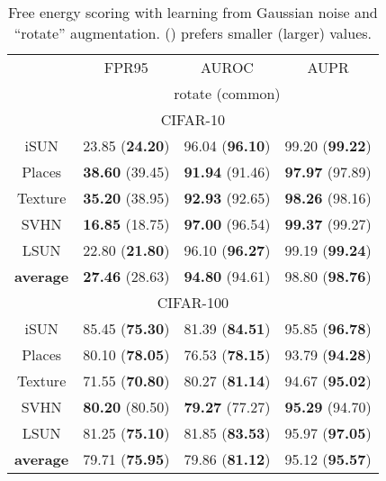 \documentclass{article}
\begin{document}
\begin{table}[t]
{{}}~~~~
\parbox{.47\linewidth}{
\centering
\caption{{Free energy scoring with learning from Gaussian noise and ``rotate'' augmentation.  () prefers smaller (larger) values.}} \label{tab: eneregy rotate}
\vspace{5pt}
\scriptsize{
\begin{tabular}{c|ccc}
\toprule[1.5pt]
                   & FPR95      & AUROC        & AUPR       \\
                   \cline{2-4} 
\multirow{-2}{*}{} & \multicolumn{3}{c}{rotate (common)} \\
\midrule[0.6pt]
\multicolumn{4}{c}{\cellcolor{greyL}CIFAR-10} \\
\midrule[0.6pt]
iSUN               & 23.85 (\textbf{24.20}) & 96.04 (\textbf{96.10}) & 99.20 (\textbf{99.22}) \\ 
Places        & \textbf{38.60} (39.45) & \textbf{91.94} (91.46) & \textbf{97.97} (97.89) \\
Texture            & \textbf{35.20} (38.95) & \textbf{92.93} (92.65) & \textbf{98.26} (98.16) \\
SVHN               & \textbf{16.85} (18.75) & \textbf{97.00} (96.54) & \textbf{99.37} (99.27) \\
LSUN               & 22.80 (\textbf{21.80}) & 96.10 (\textbf{96.27}) & 99.19 (\textbf{99.24}) \\
\midrule
\textbf{average}   & \textbf{27.46} (28.63) & \textbf{94.80} (94.61) & {98.80} (\textbf{98.76}) \\ \midrule[1pt]
\multicolumn{4}{c}{\cellcolor{greyL}CIFAR-100} \\
\midrule[1pt]
iSUN               & 85.45 (\textbf{75.30}) & 81.39 (\textbf{84.51}) & 95.85 (\textbf{96.78}) \\ 
Places        & 80.10 (\textbf{78.05}) & 76.53 (\textbf{78.15}) & 93.79 (\textbf{94.28}) \\
Texture            & 71.55 (\textbf{70.80}) & 80.27 (\textbf{81.14}) & 94.67 (\textbf{95.02}) \\
SVHN               & \textbf{80.20} (80.50) & \textbf{79.27} (77.27) & \textbf{95.29} (94.70) \\
LSUN               & 81.25 (\textbf{75.10}) & 81.85 (\textbf{83.53}) & 95.97 (\textbf{97.05}) \\
\midrule
\textbf{average}   & 79.71 (\textbf{75.95}) & 79.86 (\textbf{81.12}) & 95.12 (\textbf{95.57}) \\ \bottomrule[1.5pt]      
\end{tabular}
}}
\end{table}
\end{document}
